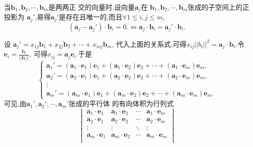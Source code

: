 \documentclass[a4paper]{article}
\begin{document}
当$\mathbf{b}_1,\mathbf{b}_2,\cdots,\mathbf{b}_m$是两两正
交的向量时.设向量$\mathbf{a}_j$在
$\mathbf{b}_1,\mathbf{b}_2,\cdots,\mathbf{b}_m$张成的子空间上的正投影为
$\mathbf{a}_j'$,易得$\mathbf{a}_j'$是存在且唯一的,而且$\forall 1\leq
i,j\leq m$,
$$
(\mathbf{a}_j-\mathbf{a}_j')\cdot \mathbf{b}_i=0.\iff \mathbf{a}_j\cdot\mathbf{b}_i=\mathbf{a}_j'\cdot\mathbf{b}_i.
$$
\iffalse
于是,
$$
\begin{cases}
  \mathbf{a}_1'\cdot \mathbf{b}_1=\mathbf{a}_1\cdot \mathbf{b}_1\\
\mathbf{a}_1'\cdot \mathbf{b}_2=\mathbf{a}_1\cdot \mathbf{b}_2,\\
\vdots\\
\mathbf{a}_1'\cdot \mathbf{b}_m=\mathbf{a}_1\cdot \mathbf{b}_m.
\end{cases}
$$
\fi
设
$\mathbf{a}_j'=x_{1j}\mathbf{b}_1+x_{2j}\mathbf{b}_2+\cdots+x_{mj}\mathbf{b}_m$,
代入上面的关系式,可得$x_{ij}||b_i||^2=\mathbf{a}_j\cdot
\mathbf{b}_i$.令$\mathbf{e}_i=\frac{\mathbf{b}_i}{||\mathbf{b}_i||}$,
可得$x_{ij}=\mathbf{a}_j\mathbf{e}_i$.于是
$$
\begin{cases}
  \mathbf{a}_1'=(\mathbf{a}_1\cdot
  \mathbf{e}_1)\mathbf{e}_1+(\mathbf{a}_1\cdot
  \mathbf{e}_2)\mathbf{e}_2+\cdots+(\mathbf{a}_1\cdot
  \mathbf{e}_m)\mathbf{e}_m,\\
  \mathbf{a}_2'=(\mathbf{a}_2\cdot
  \mathbf{e}_1)\mathbf{e}_1+(\mathbf{a}_2\cdot
  \mathbf{e}_2)\mathbf{e}_2+\cdots+(\mathbf{a}_2\cdot
  \mathbf{e}_m)\mathbf{e}_m,\\
\vdots\\
  \mathbf{a}_m'=(\mathbf{a}_m\cdot
  \mathbf{e}_1)\mathbf{e}_1+(\mathbf{a}_m\cdot
  \mathbf{e}_2)\mathbf{e}_2+\cdots+(\mathbf{a}_m\cdot
  \mathbf{e}_m)\mathbf{e}_m.
\end{cases}
$$
可见,由$\mathbf{a}_1',\mathbf{a}_2',\cdots,\mathbf{a}_m'$张成的平行体
的有向体积为行列式
\begin{equation}\label{eq:1}
\begin{vmatrix}
  \mathbf{a}_1\cdot \mathbf{e}_1&\mathbf{a}_1\cdot
  \mathbf{e}_2&\cdots&\mathbf{a}_1\cdot \mathbf{e}_m\\
  \mathbf{a}_2\cdot \mathbf{e}_1&\mathbf{a}_2\cdot
  \mathbf{e}_2&\cdots&\mathbf{a}_2\cdot \mathbf{e}_m\\
\vdots&\vdots&\ddots&\vdots\\
  \mathbf{a}_m\cdot \mathbf{e}_1&\mathbf{a}_m\cdot
  \mathbf{e}_2&\cdots&\mathbf{a}_m\cdot \mathbf{e}_m\\
\end{vmatrix}
\end{equation}
\end{document}
